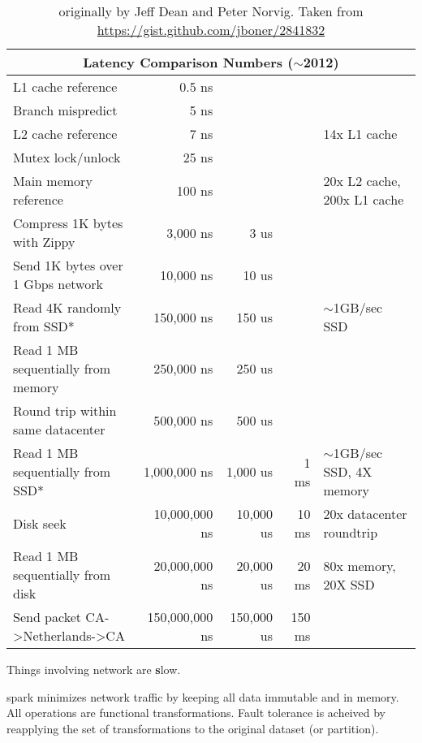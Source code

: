 \begin{table}[hbp]
\small
\begin{tabular}{l r r r l}
\multicolumn{5}{c}{Latency Comparison Numbers ($\sim$2012)} \\
\hline\hline
L1 cache reference                 &          0.5 ns &             &         &  \\
Branch mispredict                  &          5   ns &             &         &  \\
L2 cache reference                 &          7   ns &             &         & 14x L1 cache \\
Mutex lock/unlock                  &         25   ns &             &         &  \\
Main memory reference              &        100   ns &             &         & 20x L2 cache, 200x L1 cache \\
Compress 1K bytes with Zippy       &      3,000   ns &        3 us &         & \\
Send 1K bytes over 1 Gbps network  &     10,000   ns &       10 us &         & \\
Read 4K randomly from SSD*         &    150,000   ns &      150 us &         & $\sim$1GB/sec SSD \\
Read 1 MB sequentially from memory &    250,000   ns &      250 us &         & \\
Round trip within same datacenter  &    500,000   ns &      500 us &         & \\
Read 1 MB sequentially from SSD*   &  1,000,000   ns &    1,000 us &    1 ms &  $\sim$1GB/sec SSD, 4X memory \\
Disk seek                          & 10,000,000   ns &   10,000 us &   10 ms &  20x datacenter roundtrip \\
Read 1 MB sequentially from disk   & 20,000,000   ns &   20,000 us &   20 ms &  80x memory, 20X SSD \\
Send packet CA->Netherlands->CA    &150,000,000   ns &  150,000 us &  150 ms &  \\

\end{tabular}
\caption{originally by Jeff Dean and Peter Norvig. Taken from \hyperref[here]{https://gist.github.com/jboner/2841832}}
\end{table}

Things involving network are {\textbf slow}. 

spark minimizes network traffic by keeping all data immutable and in memory. All operations are functional transformations. Fault tolerance is acheived by reapplying the set of transformations to the original dataset (or partition).

